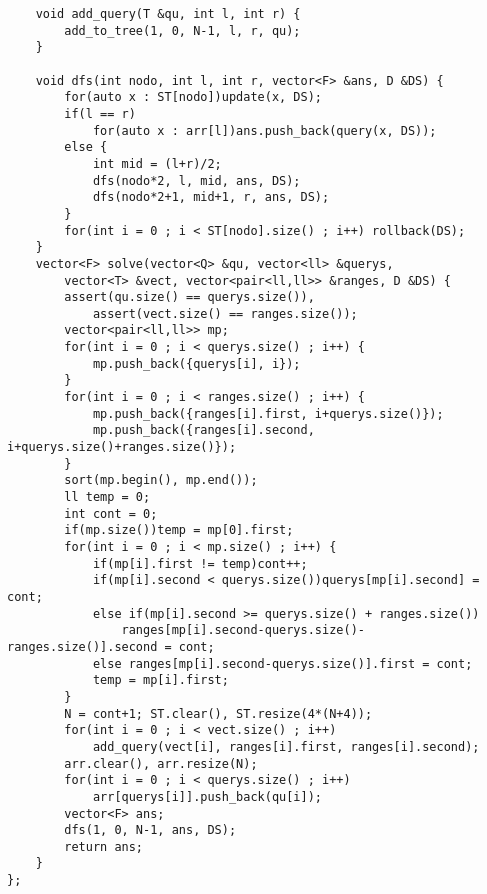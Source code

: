 \documentclass[landscape, 8pt, a4paper, oneside]{extarticle}
\begin{document}
\begin{multicols}{3}
\begin{verbatim}
    void add_query(T &qu, int l, int r) {
        add_to_tree(1, 0, N-1, l, r, qu);
    }

    void dfs(int nodo, int l, int r, vector<F> &ans, D &DS) {
        for(auto x : ST[nodo])update(x, DS);
        if(l == r)
            for(auto x : arr[l])ans.push_back(query(x, DS));
        else {
            int mid = (l+r)/2;
            dfs(nodo*2, l, mid, ans, DS);
            dfs(nodo*2+1, mid+1, r, ans, DS);
        }
        for(int i = 0 ; i < ST[nodo].size() ; i++) rollback(DS);
    }
    vector<F> solve(vector<Q> &qu, vector<ll> &querys,
        vector<T> &vect, vector<pair<ll,ll>> &ranges, D &DS) {
        assert(qu.size() == querys.size()),
            assert(vect.size() == ranges.size());
        vector<pair<ll,ll>> mp;
        for(int i = 0 ; i < querys.size() ; i++) {
            mp.push_back({querys[i], i});
        }
        for(int i = 0 ; i < ranges.size() ; i++) {
            mp.push_back({ranges[i].first, i+querys.size()});
            mp.push_back({ranges[i].second, i+querys.size()+ranges.size()});
        }
        sort(mp.begin(), mp.end());
        ll temp = 0;
        int cont = 0;
        if(mp.size())temp = mp[0].first;
        for(int i = 0 ; i < mp.size() ; i++) {
            if(mp[i].first != temp)cont++;
            if(mp[i].second < querys.size())querys[mp[i].second] = cont;
            else if(mp[i].second >= querys.size() + ranges.size())
                ranges[mp[i].second-querys.size()-ranges.size()].second = cont;
            else ranges[mp[i].second-querys.size()].first = cont;
            temp = mp[i].first;
        }
        N = cont+1; ST.clear(), ST.resize(4*(N+4));
        for(int i = 0 ; i < vect.size() ; i++)
            add_query(vect[i], ranges[i].first, ranges[i].second);
        arr.clear(), arr.resize(N);
        for(int i = 0 ; i < querys.size() ; i++)
            arr[querys[i]].push_back(qu[i]);
        vector<F> ans;
        dfs(1, 0, N-1, ans, DS);
        return ans;
    }
};
\end{verbatim}

\end{multicols}
\end{document}
